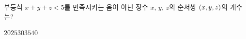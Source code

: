 부등식 $x+y+z<5$를 만족시키는 음이 아닌 정수 $x$, $y$, $z$의 순서쌍 $(x{,}\mkern3mu\mathopen{}y{,}\mkern3mu\mathopen{}z)$의 개수는?
\begin{choices32}{$20$}{$25$}{$30$}{$35$}{$40$}\end{choices32}

